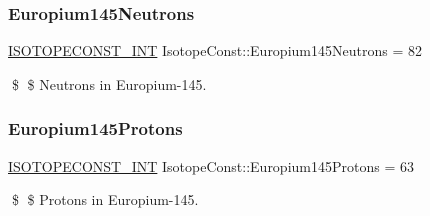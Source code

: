 \subsubsection{\texorpdfstring{Europium145\+Neutrons}{Europium145Neutrons}}
{\footnotesize\ttfamily \mbox{\hyperlink{group___isotope_const-_macros_ga5f18360b3e99483a35c32d789e62621c}{I\+S\+O\+T\+O\+P\+E\+C\+O\+N\+S\+T\+\_\+\+I\+NT}} Isotope\+Const\+::\+Europium145\+Neutrons = 82}

\$ \$ Neutrons in Europium-\/145. \mbox{\label{group___isotope_const-_europium-_eu145_gaa0c75def0ab0afb037ee3953913774e4}} 
\subsubsection{\texorpdfstring{Europium145\+Protons}{Europium145Protons}}
{\footnotesize\ttfamily \mbox{\hyperlink{group___isotope_const-_macros_ga5f18360b3e99483a35c32d789e62621c}{I\+S\+O\+T\+O\+P\+E\+C\+O\+N\+S\+T\+\_\+\+I\+NT}} Isotope\+Const\+::\+Europium145\+Protons = 63}

\$ \$ Protons in Europium-\/145. 